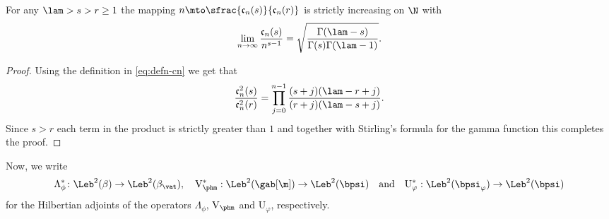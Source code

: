 \begin{lemma}
\label{lem:seq-cn}
For any $\lam > s > r \geq 1$ the mapping $n \mto \sfrac{\mathfrak{c}_n(s)}{\mathfrak{c}_n(r)}$ is strictly increasing on $\N$ with
\begin{equation}
\label{eq:asymptotic-cn}
\lim_{n \to \infty} \frac{\mathfrak{c}_n(s)}{n^{s-1}} = \sqrt{\frac{\Gamma(\lam-s)}{\Gamma(s)\Gamma(\lam-1)}}.
\end{equation}
\end{lemma}

\begin{proof}
Using the definition in \eqref{eq:defn-cn} we get that
\begin{equation*}
\frac{\mathfrak{c}_n^2(s)}{\mathfrak{c}_n^2(r)} = \prod_{j=0}^{n-1} \frac{(s+j)(\lam-r+j)}{(r+j)(\lam-s+j)}.
\end{equation*}
Since $s > r$ each term in the product is strictly greater than $1$ and together with Stirling's formula for the gamma function this completes the proof.
\end{proof}

Now, we write
\[
\Lambda^*_{\phi} \colon \Leb^2(\beta) \to \Leb^2(\beta_{\vat}),\quad \mathrm{V}_{\phm}^* : \Leb^2(\gab[\m]) \to \Leb^2(\bpsi)\quad \text{and}\quad {\mathrm{U}}_\varphi^* : \Leb^2(\bpsi_\varphi) \to \Leb^2(\bpsi)
\]
for the Hilbertian adjoints of the operators
$\Lambda_{\phi}$, $\mathrm{V}_{\phm}$ and ${\mathrm{U}}_\varphi$, respectively.

